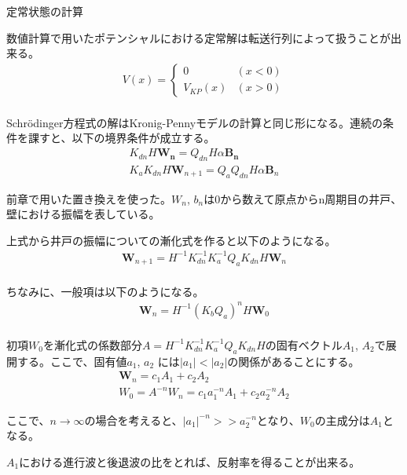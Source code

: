 \documentclass[a4paper, lualatex]{bxjsarticle}
\begin{document}
\begin{section}{定常状態の計算}
    \label{AppT}
    \par 数値計算で用いたポテンシャルにおける定常解は転送行列によって扱うことが出来る。
    \begin{align}
     V(x)=\begin{cases}0&(x<0)\\V_{KP}(x)&(x>0)\end{cases}\nonumber\\
    \end{align}
    \par Schrödinger方程式の解はKronig-Pennyモデルの計算と同じ形になる。連続の条件を課すと、以下の境界条件が成立する。
    \begin{align}
     K_{dn} H \mathbf{W_n} = Q_{dn} H \alpha \mathbf{B_n}\nonumber\\
        K_{a} K_{dn} H \mathbf{W}_{n+1} = Q_a Q_{dn} H \alpha \mathbf{B}_n
    \end{align}
    \par 前章で用いた置き換えを使った。$W_n$, $b_n$は0から数えて原点からn周期目の井戸、壁における振幅を表している。
    \par 上式から井戸の振幅についての漸化式を作ると以下のようになる。
    \begin{align}
     \mathbf{W}_{n+1}= H^{-1} K_{dn}^{-1} K_a^{-1} Q_a K_{dn} H \mathbf{W}_n\nonumber\\
    \end{align}
    \par ちなみに、一般項は以下のようになる。
    \begin{align}
     \mathbf{W}_n = H^{-1} \left( K_b Q_a \right)^n H \mathbf{W}_0\nonumber\\
    \end{align}
    \par 初項$W_0$を漸化式の係数部分$A = H^{-1} K_{dn}^{-1} K_a^{-1} Q_a K_{dn} H$の固有ベクトル$A_1$, $A_2$で展開する。ここで、固有値$a_1$, $a_2$ には$|a_1|<|a_2|$の関係があることにする。
    \begin{align}
     \mathbf{W}_n = c_1 A_1 + c_2 A_2\nonumber\\
      W_0 = A^{-n} W_n = c_1 a_1^{-n} A_1 + c_2 a_2^{-n} A_2
    \end{align}
    \par ここで、$n \rightarrow \infty$の場合を考えると、$|a_1|^{-n}>>a_2^{-n}$となり、$W_0$の主成分は$A_1$となる。
    \par $A_1$における進行波と後退波の比をとれば、反射率を得ることが出来る。
\end{section}
\end{document}
